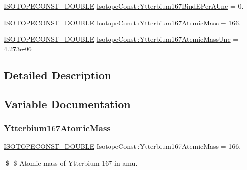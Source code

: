 \begin{DoxyCompactItemize}
\mbox{\hyperlink{group___isotope_const-_macros_ga8f45a7272ce02c0b4c65c44636ed719a}{I\+S\+O\+T\+O\+P\+E\+C\+O\+N\+S\+T\+\_\+\+D\+O\+U\+B\+LE}} \mbox{\hyperlink{group___isotope_const-_ytterbium-_yb167_gaa7368a599ba8fb37594c6d41455b4e8b}{Isotope\+Const\+::\+Ytterbium167\+Bind\+E\+Per\+A\+Unc}} = 0.
\item 
\mbox{\hyperlink{group___isotope_const-_macros_ga8f45a7272ce02c0b4c65c44636ed719a}{I\+S\+O\+T\+O\+P\+E\+C\+O\+N\+S\+T\+\_\+\+D\+O\+U\+B\+LE}} \mbox{\hyperlink{group___isotope_const-_ytterbium-_yb167_ga1b41b65d2fdffae2a9042604a67cca55}{Isotope\+Const\+::\+Ytterbium167\+Atomic\+Mass}} = 166.
\item 
\mbox{\hyperlink{group___isotope_const-_macros_ga8f45a7272ce02c0b4c65c44636ed719a}{I\+S\+O\+T\+O\+P\+E\+C\+O\+N\+S\+T\+\_\+\+D\+O\+U\+B\+LE}} \mbox{\hyperlink{group___isotope_const-_ytterbium-_yb167_ga0c5646f1770cf7111cbf8c5a132d6a6e}{Isotope\+Const\+::\+Ytterbium167\+Atomic\+Mass\+Unc}} = 4.\+273e-\/06
\end{DoxyCompactItemize}


\subsection{Detailed Description}


\subsection{Variable Documentation}
\mbox{\label{group___isotope_const-_ytterbium-_yb167_ga1b41b65d2fdffae2a9042604a67cca55}} 
\subsubsection{\texorpdfstring{Ytterbium167\+Atomic\+Mass}{Ytterbium167AtomicMass}}
{\footnotesize\ttfamily \mbox{\hyperlink{group___isotope_const-_macros_ga8f45a7272ce02c0b4c65c44636ed719a}{I\+S\+O\+T\+O\+P\+E\+C\+O\+N\+S\+T\+\_\+\+D\+O\+U\+B\+LE}} Isotope\+Const\+::\+Ytterbium167\+Atomic\+Mass = 166.}

\$ \$ Atomic mass of Ytterbium-\/167 in amu. \mbox{\label{group___isotope_const-_ytterbium-_yb167_ga0c5646f1770cf7111cbf8c5a132d6a6e}} 

